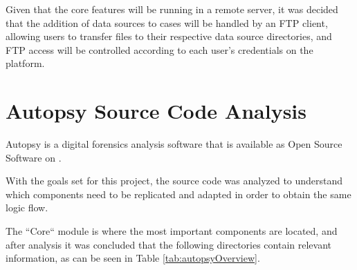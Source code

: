 Given that the core features will be running in a remote server, it was decided that the addition of data sources to cases will be handled by an FTP client, allowing users
to transfer files to their respective data source directories, and FTP access will be controlled according to each user's credentials on the platform.

\section{Autopsy Source Code Analysis}

Autopsy is a digital forensics analysis software that is available as Open Source Software \cite{opensource} on  \cite{github}.

With the goals set for this project, the source code was analyzed to understand which components need to be replicated and adapted in order to obtain the same logic flow.

The ``Core`` module is where the most important components are located, and after analysis it was concluded that the following directories contain relevant information, as can be seen in Table \ref{tab:autopsyOverview}.

